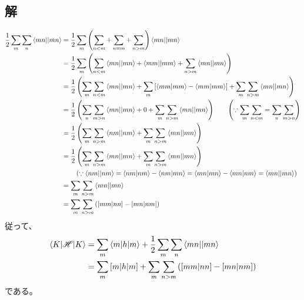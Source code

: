 \subsection{解}
\begin{align}
	\frac{1}{2}
	\sum_m \sum_n \antitwo{mn}{mn}
&=
	\frac{1}{2}
	\sum_m
	\left(
		\sum_{n<m}
		+
		\sum_{n=m}
		+
		\sum_{n>m}
	\right) \antitwo{mn}{mn} \\
%
%
&=
	\frac{1}{2}
	\sum_m
	\left(
		\sum_{n<m} \antitwo{mn}{mn}
		+
		\antitwo{mm}{mm}
		+
		\sum_{n>m} \antitwo{mn}{mn}
	\right) \\
%
%
&=
	\frac{1}{2}
	\left(
		\sum_m \sum_{n<m} \antitwo{mn}{mn}
		+
		\sum_m
		\left[
			\phystwo{mm}{mm}
			-
			\phystwo{mm}{mm}
		\right]
		+
		\sum_m \sum_{n>m} \antitwo{mn}{mn}
	\right) \\
%
%
&=
	\frac{1}{2}
	\left(
		\sum_n \sum_{m>n} \antitwo{mn}{mn}
		+
		0
		+
		\sum_m \sum_{n>m} \antitwo{mn}{mn}
	\right)
	\qquad
	\left(
		\because
		\sum_m \sum_{n<m} = \sum_n \sum_{m>n}
	\right) \\
%
%
&=
	\frac{1}{2}
	\left(
		\sum_m \sum_{n>m} \antitwo{nm}{nm}
		+
		\sum_m \sum_{n>m} \antitwo{mn}{mn}
	\right) \\
%
%
&=
	\frac{1}{2}
	\left(
		\sum_m \sum_{n>m} \antitwo{mn}{mn}
		+
		\sum_m \sum_{n>m} \antitwo{mn}{mn}
	\right) \nonumber \\ &
	\qquad
	\left(
		\because
		\antitwo{nm}{nm}
		=
		\phystwo{nm}{nm} -\phystwo{nm}{mn}
		=
		\phystwo{mn}{mn} -\phystwo{mn}{nm}
		=
		\antitwo{mn}{mn}
	\right) \\
%
%
&=
	\sum_m \sum_{n>m} \antitwo{mn}{mn} \\
%
%
&=
	\sum_m \sum_{n>m}
	\left(
		\chemtwo{mm}{nn}
		-
		\chemtwo{mn}{nm}
	\right)
\end{align}
従って、
\begin{align}
	\braket{K|\mathscr{H}|K}
&=
	\sum_{m} \braket{m|h|m}
	+
	\frac{1}{2}
	\sum_{m} \sum_{n} \antitwo{mn}{mn} \\
%
%
&=
	\sum_m \chemone{m}{h}{m}
	+
	\sum_m \sum_{n>m}
	\left(
		\chemtwo{mm}{nn}
		-
		\chemtwo{mn}{nm}
	\right)
\end{align}
である。
